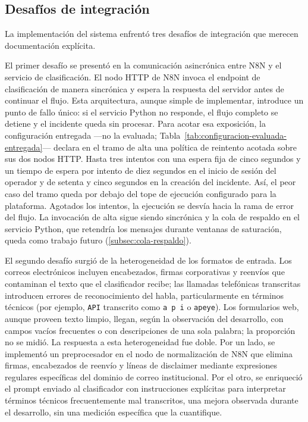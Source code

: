 \subsection{Desafíos de integración}\label{subsec:desafios-integracion}

La implementación del sistema enfrentó tres desafíos de integración que merecen documentación explícita.

El primer desafío se presentó en la comunicación asincrónica entre N8N y el servicio de clasificación. El nodo HTTP de N8N invoca el endpoint de clasificación de manera sincrónica y espera la respuesta del servidor antes de continuar el flujo. Esta arquitectura, aunque simple de implementar, introduce un punto de fallo único: si el servicio Python no responde, el flujo completo se detiene y el incidente queda sin procesar. Para acotar esa exposición, la configuración entregada ---no la evaluada; Tabla~\ref{tab:configuracion-evaluada-entregada}--- declara en el tramo de alta una política de reintento acotada sobre sus dos nodos HTTP. Hasta tres intentos con una espera fija de cinco segundos y un tiempo de espera por intento de diez segundos en el inicio de sesión del operador y de setenta y cinco segundos en la creación del incidente. Así, el peor caso del tramo queda por debajo del tope de ejecución configurado para la plataforma. Agotados los intentos, la ejecución se desvía hacia la rama de error del flujo. La invocación de alta sigue siendo sincrónica y la cola de respaldo en el servicio Python, que retendría los mensajes durante ventanas de saturación, queda como trabajo futuro (\autoref{subsec:cola-respaldo}).

El segundo desafío surgió de la heterogeneidad de los formatos de entrada. Los correos electrónicos incluyen encabezados, firmas corporativas y reenvíos que contaminan el texto que el clasificador recibe; las llamadas telefónicas transcritas introducen errores de reconocimiento del habla, particularmente en términos técnicos (por ejemplo, \texttt{API} transcrito como \texttt{a p i} o \texttt{apeye}). Los formularios web, aunque proveen texto limpio, llegan, según la observación del desarrollo, con campos vacíos frecuentes o con descripciones de una sola palabra; la proporción no se midió. La respuesta a esta heterogeneidad fue doble. Por un lado, se implementó un preprocesador en el nodo de normalización de N8N que elimina firmas, encabezados de reenvío y líneas de disclaimer mediante expresiones regulares específicas del dominio de correo institucional. Por el otro, se enriqueció el prompt enviado al clasificador con instrucciones explícitas para interpretar términos técnicos frecuentemente mal transcritos, una mejora observada durante el desarrollo, sin una medición específica que la cuantifique.

